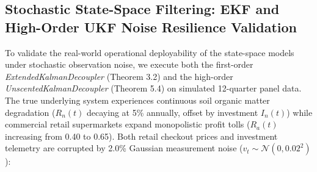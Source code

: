 \documentclass[preprint,12pt,authoryear]{elsarticle}
\theoremstyle{definition}
\begin{document}
\begin{table}[htbp]
\caption{Empirical Parameterization and Systemic Telemetry Matrix 3}
\label{tab:matrix_3}
\end{table}

\subsection{Stochastic State-Space Filtering: EKF and High-Order UKF Noise Resilience Validation}

To validate the real-world operational deployability of the state-space models under stochastic observation noise, we execute both the first-order \textit{ExtendedKalmanDecoupler} (Theorem 3.2) and the high-order \textit{UnscentedKalmanDecoupler} (Theorem 5.4) on simulated 12-quarter panel data. The true underlying system experiences continuous soil organic matter degradation ($R_n(t)$ decaying at 5\% annually, offset by investment $I_n(t)$) while commercial retail supermarkets expand monopolistic profit tolls ($R_a(t)$ increasing from 0.40 to 0.65). Both retail checkout prices and investment telemetry are corrupted by 2.0\% Gaussian measurement noise ($v_t \sim \mathcal{N}(0, 0.02^2)$):
\end{document}
